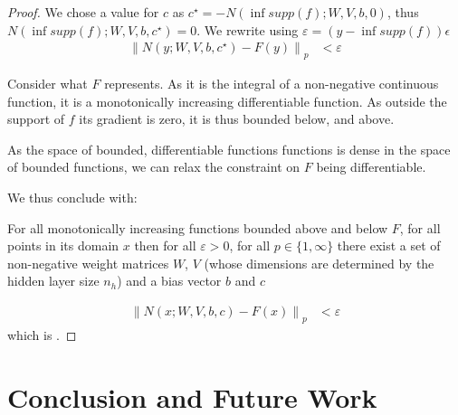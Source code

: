 \documentclass{article} %
\begin{document}
\begin{proof}

We chose a value for $c$ as $c^\star=-N(\inf supp(f);W,V,b, 0)$, thus $N(\inf supp(f);W,V,b, c^\star)=0$.
We rewrite using $\varepsilon = \left( y-\inf supp(f) \right)  \epsilon$
\begin{align}
\left\| N(y;W,V,b, c^\star) - F(y) \right\|_p &< \varepsilon
\end{align}

Consider what $F$ represents.
As it is the integral of a non-negative continuous function, it is a monotonically increasing differentiable function.
As outside the support of $f$ its gradient is zero, it is thus bounded below, and above.

As the space of bounded, differentiable functions functions is dense in the space of bounded functions, we can relax the constraint on $F$ being differentiable.

We thus conclude with:

For all monotonically increasing functions bounded above and below $F$,
for all points in its domain $x$
then for all $\varepsilon > 0$, for all $p\in \lbrace 1, \infty \rbrace$
there exist a set of non-negative weight matrices $W$, $V$ (whose dimensions are determined by the hidden layer size $n_h$) and a bias vector $b$ and $c$

\begin{align}
\left\| N(x;W,V,b, c) - F(x) \right\|_p &< \varepsilon
\end{align}
which is .
\end{proof}


\section{Conclusion and Future Work}



\end{document}
